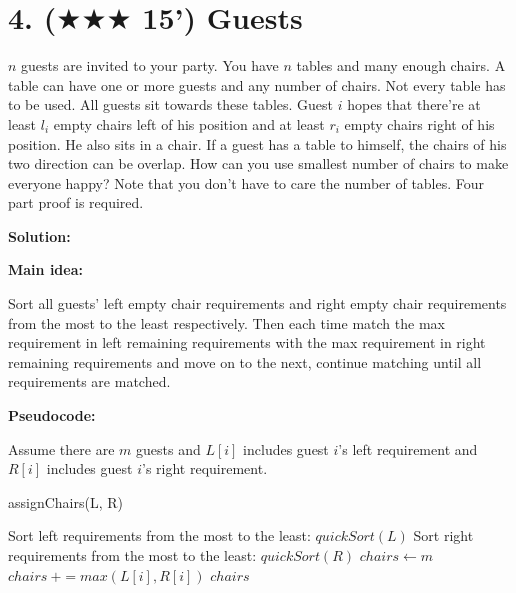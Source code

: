\documentclass{article}
\begin{document}
\section*{4. ($\bigstar\bigstar\bigstar$ 15') Guests }
$n$ guests are invited to your party. You have $n$ tables and many enough chairs. A table can have one or more guests and
any number of chairs. Not every table has to be used. All guests sit towards these tables.
Guest $i$ hopes that there're at
least $l_i$ empty chairs left of his position and at least $r_i$ empty chairs right of his position. 
He also sits in a chair. 
If a guest has a table to himself, the chairs of his two direction can be overlap. How can you use
smallest number of chairs to make everyone happy? Note that you don't have to care the number of tables.
Four part proof is required. 
{\color{blue}
\par\textbf{Solution: }
\par\textbf{Main idea: }
\par Sort all guests' left empty chair requirements and right empty chair requirements from the most to the least respectively. Then each time match the max requirement in left remaining requirements with the max requirement in right remaining requirements and move on to the next, continue matching until all requirements are matched.\\

\par\textbf{Pseudocode: }
\par Assume there are $m$ guests and $L[i]$ includes guest $i$'s left requirement and $R[i]$ includes guest $i$'s right requirement.
\begin{algorithm}
	\caption{assignChairs(L, R)}
	\label{alg2}
	\color{blue}
	\begin{algorithmic}
		\STATE Sort left requirements from the most to the least: $quickSort(L)$
		\STATE Sort right requirements from the most to the least: $quickSort(R)$
		\STATE $chairs \gets m$
			\STATE $chairs\ += max(L[i], R[i])$
		\ENDWHILE
		\RETURN $chairs$
	\end{algorithmic}
\end{algorithm}

}
\end{document}
